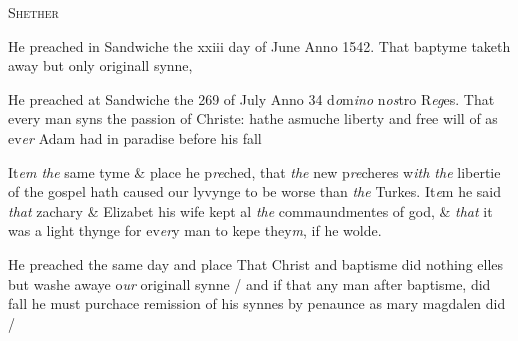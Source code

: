 \documentclass[12pt, a4paper]{book}
\begin{document}
               
               	
				\begin{center}  {\scshape Shether}  \end{center}
			
               	
               		
				\marginpar[\vspace{0.5cm}{\textcolor{Gray}{herecie n
               		}}]{}
			
               		
		\ifthenelse{\isodd{\thepage}}
		{\reversemarginpar}
		{\normalmarginpar}
		He preached in Sandwiche the xxiii day of June Anno 1542.
               			That baptyme taketh away but only originall synne,
               	
               	
               		
			
               		
		\ifthenelse{\isodd{\thepage}}
		{\reversemarginpar}
		{\normalmarginpar}
		He preached at Sandwiche the 269
			 of July Anno 34 d\textit{o}m\textit{ino}
               			n\textit{os}tro R\textit{eg}es. That every man syns
               			the passion of Christe: hathe asmuche liberty and free will of as
               			ev\textit{er} Adam had in paradise before his fall
               	
               	
               		
		\ifthenelse{\isodd{\thepage}}
		{\reversemarginpar}
		{\normalmarginpar}
		
               			It\textit{em the} same tyme \& place
               				he p\textit{re}ched, that \textit{the} new
               				p\textit{re}cheres w\textit{ith the} libertie of
               				the gospel hath caused our lyvynge to be worse than
               				\textit{the} Turkes. It\textit{e}m he said
               				\textit{that} zachary \& Elizabet his wife kept al
               				\textit{the} commaundmentes of god, \&
               				\textit{that} it was a light thynge for
               				ev\textit{er}y man to kepe they\textit{m}, if he
               				wolde.
			
               		
               	
               	
               		
		\ifthenelse{\isodd{\thepage}}
		{\reversemarginpar}
		{\normalmarginpar}
		He preached the same day and place That Christ and
               			baptisme did nothing elles but washe awaye o\textit{ur}
               			originall synne / and if that any man after
               			baptisme, did fall he must purchace remission of his synnes by
               			penaunce as mary magdalen did /
               		
\end{document}
